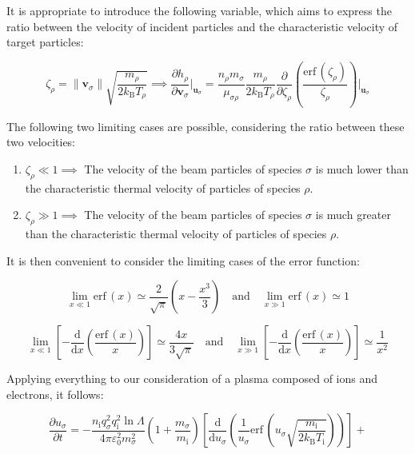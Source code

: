 It is appropriate to introduce the following variable, which aims to express the ratio between the velocity of incident particles and the characteristic velocity of target particles:

\begin{equation}
    \zeta_\rho=\|\mathbf{v}_\sigma\|\sqrt{\frac{m_\rho}{2k_\mathrm{B}T_\rho}}\implies\frac{\partial h_\rho}{\partial\mathbf{v}_\sigma}\Biggr|_{\mathbf{u}_\sigma}=\frac{n_\rho m_\sigma}{\mu_{\sigma\rho}}\frac{m_\rho}{2k_\mathrm{B}T_\rho}\frac{\partial}{\partial\zeta_\rho}\left(\frac{\mathrm{erf}\,\left(\zeta_\rho\right)}{\zeta_\rho}\right)\Biggr|_{\mathbf{u}_\sigma}
\end{equation}

The following two limiting cases are possible, considering the ratio between these two velocities:

\begin{enumerate}
    \item $\zeta_\rho\ll1\implies$ The velocity of the beam particles of species $\sigma$ is much lower than the characteristic thermal velocity of particles of species $\rho$.
    \item $\zeta_\rho\gg1\implies$ The velocity of the beam particles of species $\sigma$ is much greater than the characteristic thermal velocity of particles of species $\rho$.
\end{enumerate}

It is then convenient to consider the limiting cases of the error function:

\begin{equation}
    \lim_{x\ll1}\mathrm{erf}\,(x)\simeq\frac{2}{\sqrt{\pi}}\left(x-\frac{x^3}{3}\right)\quad\text{and}\quad\lim_{x\gg1}\mathrm{erf}\,(x)\simeq1
\end{equation}

\begin{equation}
    \label{eq-7-48}
    \lim_{x\ll1}\left[-\frac{\mathrm{d}}{\mathrm{d}x}\left(\frac{\mathrm{erf}\,(x)}{x}\right)\right]\simeq\frac{4x}{3\sqrt{\pi}}\quad\text{and}\quad\lim_{x\gg1}\left[-\frac{\mathrm{d}}{\mathrm{d}x}\left(\frac{\mathrm{erf}\,(x)}{x}\right)\right]\simeq\frac{1}{x^2}
\end{equation}

Applying everything to our consideration of a plasma composed of ions and electrons, it follows:

\begin{equation*}
    \frac{\partial u_\sigma}{\partial t}=-\frac{n_\mathrm{i}q_\sigma^2q_\mathrm{i}^2\ln{\Lambda}}{4\pi\varepsilon_0^2m_\sigma^2}\left(1+\frac{m_\sigma}{m_\mathrm{i}}\right)\left[\frac{\mathrm{d}}{\mathrm{d}u_\sigma}\left(\frac{1}{u_\sigma}\mathrm{erf}\,\left(u_\sigma\sqrt{\frac{m_\mathrm{i}}{2k_\mathrm{B}T_\mathrm{i}}}\right)\right)\right]+
\end{equation*}

